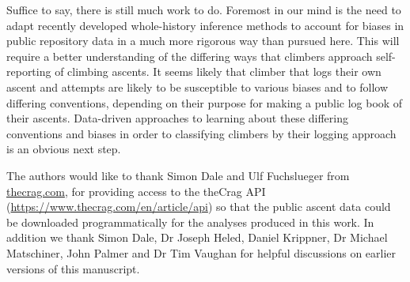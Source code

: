 \documentclass[ba]{imsart}
\begin{document}
Suffice to say, there is still much work to do. Foremost in our mind is the need to adapt recently developed whole-history inference methods to account for biases in public repository data in a much more rigorous way than pursued here. This will require a better understanding of the differing ways that climbers approach self-reporting of climbing ascents. It seems likely that climber that logs their own ascent and attempts are likely to be susceptible to various biases and to follow differing conventions, depending on their purpose for making a public log book of their ascents. Data-driven approaches to learning about these differing conventions and biases in order to classifying climbers by their logging approach is an obvious next step.

\begin{acks}[Acknowledgments]
The authors would like to thank Simon Dale and Ulf Fuchslueger from \url{thecrag.com}, for providing access to the theCrag API (\url{https://www.thecrag.com/en/article/api}) so that the public ascent data could be downloaded programmatically for the analyses produced in this work. In addition we thank Simon Dale, Dr Joseph Heled, Daniel Krippner, Dr Michael Matschiner, John Palmer and Dr Tim Vaughan for helpful discussions on earlier versions of this manuscript.
\end{acks}

\printglossaries

\begin{supplement}
\end{supplement}



\end{document}
